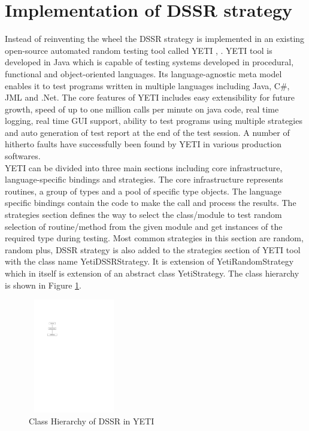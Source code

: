 \documentclass[conference]{IEEEtran}
\begin{document}
\section{Implementation of DSSR strategy}
Instead of reinventing the wheel the DSSR strategy is implemented in an existing open-source automated random testing tool called YETI \cite{Oriol2011}, \cite{Oriol2012}. YETI tool is developed in Java which is capable of testing systems developed in procedural, functional and object-oriented languages. Its language-agnostic meta model enables it to test programs written in multiple languages including Java, C\#, JML and .Net. The core features of YETI includes easy extensibility for future growth, speed of up to one million calls per minute on java code, real time logging, real time GUI support, ability to test programs using multiple strategies and auto generation of test report at the end of the test session. A number of hitherto faults have successfully been found by YETI in various production softwares. \\
\indent YETI can be divided into three main sections including core infrastructure, language-specific bindings and strategies. The core infrastructure represents routines, a group of types and a pool of specific type objects. The  language specific bindings contain the code to make the call and process the results. The strategies section defines the way to select the class/module to test random selection of routine/method from the given module and get instances of the required type during testing. Most common strategies in this section are random, random plus, DSSR strategy is also added to the strategies section of YETI tool with the class name YetiDSSRStrategy. It is extension of YetiRandomStrategy which in itself is extension of an abstract class YetiStrategy. The class hierarchy is shown in Figure \ref{fig:hierarchyofDSSR}.

\begin{figure}[ht]
\centering
\includegraphics[width=4cm,height=5cm]{hierarchy.pdf}
\caption{Class Hierarchy of DSSR in YETI}
\label{fig:hierarchyofDSSR}
\end{figure}
\end{document}
